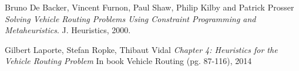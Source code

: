 \documentclass[12pt,twoside]{report}
\begin{document}



\tableofcontents







\begin{thebibliography}{9}{}

Bruno De Backer, Vincent Furnon, Paul Shaw, Philip Kilby and Patrick Prosser
\textit{Solving Vehicle Routing Problems Using Constraint Programming and Metaheuristics}.
J. Heuristics, 2000.

Gilbert Laporte, Stefan Ropke, Thibaut Vidal
\textit{Chapter 4: Heuristics for the Vehicle Routing Problem}
In book Vehicle Routing (pg. 87-116), 2014 
\end{thebibliography}
\end{document}
